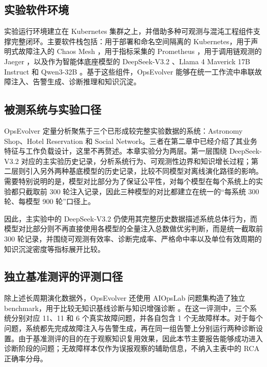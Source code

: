 \subsection{实验软件环境}

实验运行环境建立在 Kubernetes 集群之上，并借助多种可观测与混沌工程组件支撑完整闭环。主要软件栈包括：用于部署和命名空间隔离的 Kubernetes，用于声明式故障注入的 Chaos Mesh \cite{chaosmesh}，用于指标采集的 Prometheus \cite{prometheus}，用于调用链观测的 Jaeger \cite{jaeger}，以及作为智能体底座模型的 DeepSeek-V3.2 \cite{liu2025deepseek}、Llama 4 Maverick 17B Instruct \cite{adcock2026llama} 和 Qwen3-32B \cite{yang2025qwen3}。基于这些组件，OpsEvolver 能够在统一工作流中串联故障注入、告警生成、诊断推理和知识沉淀。

\subsection{被测系统与实验口径}

OpsEvolver 定量分析聚焦于三个已形成较完整实验数据的系统：Astronomy Shop、Hotel Reservation 和 Social Network。三者在第二章中已经介绍了其业务特征与工作负载设计，这里不再赘述。本章实验分为两层。第一层围绕 DeepSeek-V3.2 对应的主实验历史记录，分析系统行为、可观测性边界和知识增长过程；第二层则引入另外两种基底模型的历史记录，比较不同模型对离线演化路径的影响。需要特别说明的是，模型对比部分为了保证公平性，对每个模型在每个系统上的实验都只截取前 300 轮注入记录，因此三种模型的对比都建立在统一的“每系统 300 轮、每模型 900 轮”口径上。

因此，主实验中的 DeepSeek-V3.2 仍使用其完整历史数据描述系统总体行为，而模型对比部分则不再直接使用各模型的全量注入总数做优劣判断，而是统一截取前 300 轮记录，并围绕可观测有效率、诊断完成率、严格命中率以及单位有效周期的知识沉淀密度等指标展开比较。

\subsection{独立基准测评的评测口径}

除上述长周期演化数据外，OpsEvolver 还使用 AIOpsLab 问题集构造了独立 benchmark，用于比较无知识基线诊断与知识增强诊断 \cite{chen2025aiopslab}。在这一评测中，三个系统分别对应 11、11 和 6 个真实故障问题，并各自包含 1 个无故障样本。对于每个问题，系统都先完成故障注入与告警生成，再在同一组告警上分别运行两种诊断设置。由于基准测评的目的在于观察知识复用效果，因此本节主要报告能够成功进入诊断阶段的问题；无故障样本仅作为误报观察的辅助信息，不纳入主表中的 RCA 正确率分母。

